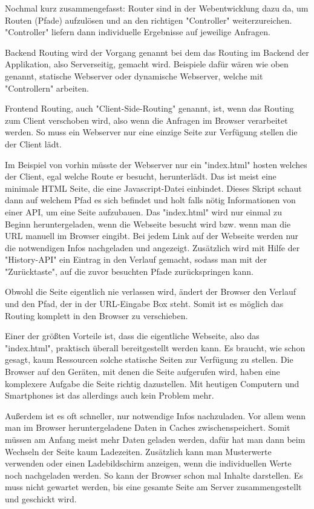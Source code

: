 Nochmal kurz zusammengefasst: Router sind in der Webentwicklung dazu da, um Routen (Pfade) aufzulösen und an den richtigen "Controller" weiterzureichen. "Controller" liefern dann individuelle Ergebnisse auf jeweilige Anfragen.


Backend Routing wird der Vorgang genannt bei dem das Routing im Backend der Applikation, also Serverseitig, gemacht wird. Beispiele dafür wären wie oben genannt, statische Webserver oder dynamische Webserver, welche mit "Controllern" arbeiten.


Frontend Routing, auch "Client-Side-Routing" genannt, ist, wenn das Routing zum Client verschoben wird, also wenn die Anfragen im Browser verarbeitet werden. So muss ein Webserver nur eine einzige Seite zur Verfügung stellen die der Client lädt.

Im Beispiel von vorhin müsste der Webserver nur ein "{\ttfamily index.html}" hosten welches der Client, egal welche Route er besucht, herunterlädt. Das ist meist eine minimale HTML Seite, die eine Javascript-Datei einbindet. Dieses Skript schaut dann auf welchem Pfad es sich befindet und holt falls nötig Informationen von einer API, um eine Seite aufzubauen. Das "{\ttfamily index.html}" wird nur einmal zu Beginn heruntergeladen, wenn die Webseite besucht wird bzw. wenn man die URL manuell im Browser eingibt. Bei jedem Link auf der Webseite werden nur die notwendigen Infos nachgeladen und angezeigt. Zusätzlich wird mit Hilfe der "History-API" ein Eintrag in den Verlauf gemacht, sodass man mit der "Zurücktaste", auf die zuvor besuchten Pfade zurückspringen kann.

Obwohl die Seite eigentlich nie verlassen wird, ändert der Browser den Verlauf und den Pfad, der in der URL-Eingabe Box steht. Somit ist es möglich das Routing komplett in den Browser zu verschieben.


Einer der größten Vorteile ist, dass die eigentliche Webseite, also das "{\ttfamily index.html}", praktisch überall bereitgestellt werden kann. Es braucht, wie schon gesagt, kaum Ressourcen solche statische Seiten zur Verfügung zu stellen. Die Browser auf den Geräten, mit denen die Seite aufgerufen wird, haben eine komplexere Aufgabe die Seite richtig dazustellen. Mit heutigen Computern und Smartphones ist das allerdings auch kein Problem mehr.

Außerdem ist es oft schneller, nur notwendige Infos nachzuladen. Vor allem wenn man im Browser heruntergeladene Daten in Caches zwischenspeichert. Somit müssen am Anfang meist mehr Daten geladen werden, dafür hat man dann beim Wechseln der Seite kaum Ladezeiten. Zusätzlich kann man Musterwerte verwenden oder einen Ladebildschirm anzeigen, wenn die individuellen Werte noch nachgeladen werden. So kann der Browser schon mal Inhalte darstellen. Es muss nicht gewartet werden, bis eine gesamte Seite am Server zusammengestellt und geschickt wird.

